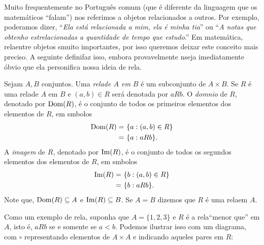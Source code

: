 Muito frequentemente no Portugu\^es comum (que \'e diferente da linguagem que os matem\'aticos ``falam'') nos referimos a  objetos relacionados a outros. Por exemplo, poder\ih amos dizer, ``\emph{Ela est\'a relacionada a mim, ela \'e minha tia}'' ou ``\emph{A notas que obtenho est\ao relacionadas a quantidade de tempo que estudo}.'' Em matem\'atica, rela\coes entre objetos s\ao muito importantes, por isso queremos deixar este conceito mais preciso. A seguinte defini\cao faz isso, embora provavelmente n\ao seja imediatamente \'obvio  que ela personifica nossa ideia de rela\caoi. 
\begin{definb}
Sejam $A,B$ conjuntos. Uma {\it rela\cao de $A$ em $B$} \'e um subconjunto de $A\times B$. Se $R$ \'e uma rela\cao de $A$ em $B$ e $(a,b)\in R$ ser\'a denotada por $aRb$. O {\it dom\ih nio} de $R$, denotado por $\operatorname{Dom}(R)$, \'e o conjunto de todos os primeiros elementos dos elementos de $R$, em s\ih mbolos
\begin{equation*}
 \begin{aligned}
\operatorname{Dom}(R)=&\textrm{ } \{a: (a,b)\in R\}\\
      =&\textrm{ } \{a: aRb\}.
 \end{aligned}
\end{equation*}  
A {\it imagem} de $R$, denotado por $\operatorname{Im}(R)$, \'e o conjunto de todos os segundos elementos dos elementos de $R$, em s\ih mbolos
\begin{equation*}
 \begin{aligned}
\operatorname{Im}(R)=&\textrm{ } \{b: (a,b)\in R\}\\
     =&\textrm{ } \{b: aRb\}.
 \end{aligned}
\end{equation*}
Note que, $\operatorname{Dom}(R)\subseteq A$ e $\operatorname{Im}(R)\subseteq B$. Se $A=B$ dizemos que $R$ \'e uma rela\cao em $A$. 
\end{definb}

Como um exemplo de rela\caoi, suponha que $A=\{1,2,3\}$ e $R$ \'e a rela\cao ``menor que'' em $A$, isto \'e, $aRb$ se e somente se $a<b$. Podemos ilustrar isso com um diagrama, com $\circ$ representando elementos de $A\times A$ e \frame{$\circ$} indicando aqueles pares em $R$:

